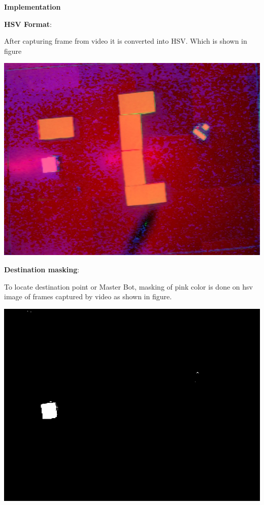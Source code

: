 \documentclass[report]{res}
\begin{document}
	\pagebreak	
	
	
	\begin{center}
		\textbf{\huge Implementation} \\
	\end{center}
	
	\textbf{HSV Format}:
	
	After capturing frame from video it is converted into HSV. Which is shown in figure
	
	\begin{center}
		\includegraphics[scale = 0.7]{graphics/case1/have_video.jpeg}\\
	\end{center}
	
	\pagebreak
	
	
	\textbf{Destination masking}:	
	
	To locate destination point or Master Bot, masking of pink color is done on hsv image of frames captured by video as shown in figure.
	
	\begin{center}
		\includegraphics[scale = 0.7]{graphics/case1/destination_mask.jpeg}\\
	\end{center}
	
\end{document}
